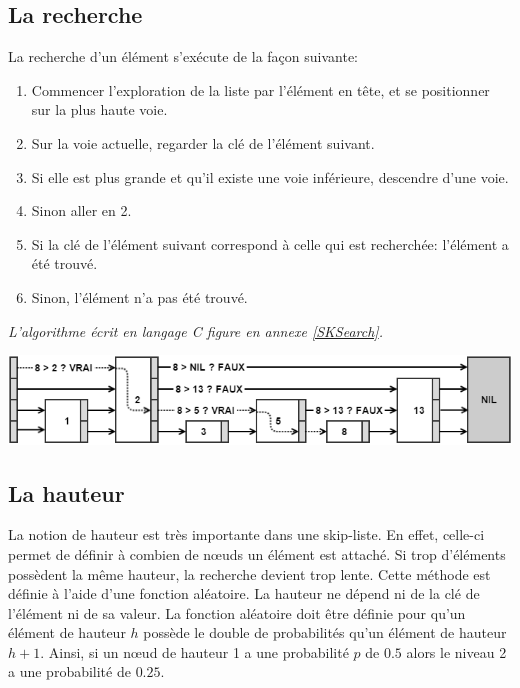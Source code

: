 \documentclass[hidelinks,a4paper, 12pt]{article}
\begin{document}
	\subsection{La recherche}
	La recherche d'un élément s'exécute de la façon suivante:
	\begin{enumerate}
		\item Commencer l'exploration de la liste par l'élément en tête, et se positionner sur la plus haute voie.
		\item Sur la voie actuelle, regarder la clé de l'élément suivant.
		\item Si elle est plus grande et qu'il existe une voie inférieure, descendre d'une voie.
		\item Sinon aller en 2.
		\item Si la clé de l'élément suivant correspond à celle qui est recherchée: l'élément a été trouvé.
		\item Sinon, l'élément n'a pas été trouvé.
	\end{enumerate}
	\emph{L'algorithme écrit en langage C figure en annexe \ref{SKSearch}.}
	\begin{center}
		\includegraphics[width=\textwidth]{img/search}
	\end{center}
	
	\subsection{La hauteur}
	La notion de hauteur est très importante dans une skip-liste. En effet, celle-ci permet de définir à combien de nœuds un élément est attaché. Si trop d'éléments possèdent la même hauteur, la recherche devient trop lente.	Cette méthode est définie à l'aide d'une fonction aléatoire. La hauteur ne dépend ni de la clé de l'élément ni de sa valeur. La fonction aléatoire doit être définie pour qu'un élément de hauteur $h$ possède le double de probabilités qu'un élément de hauteur $h+1$. Ainsi, si un nœud de hauteur 1 a une probabilité $p$ de $0.5$ alors le niveau 2 a une probabilité de $0.25$.
	
\end{document}
